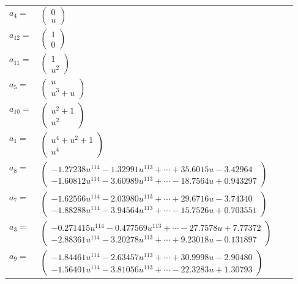 \documentclass[1p]{elsarticle_modified}
\theoremstyle{definition}
\begin{document}
\begin{tabular}{m{7pt} m{180pt} m{7pt} m{180pt} }
\flushright $a_{4}=$&$\begin{pmatrix}0\\u\end{pmatrix}$ \\
\flushright $a_{12}=$&$\begin{pmatrix}1\\0\end{pmatrix}$ \\
\flushright $a_{11}=$&$\begin{pmatrix}1\\u^2\end{pmatrix}$ \\
\flushright $a_{5}=$&$\begin{pmatrix}u\\u^3+u\end{pmatrix}$ \\
\flushright $a_{10}=$&$\begin{pmatrix}u^2+1\\u^2\end{pmatrix}$ \\
\flushright $a_{1}=$&$\begin{pmatrix}u^4+u^2+1\\u^4\end{pmatrix}$ \\
\flushright $a_{8}=$&$\begin{pmatrix}-1.27238 u^{114}-1.32991 u^{113}+\cdots+35.6015 u-3.42964\\-1.60812 u^{114}-3.60989 u^{113}+\cdots-18.7564 u+0.943297\end{pmatrix}$ \\
\flushright $a_{7}=$&$\begin{pmatrix}-1.62566 u^{114}-2.03980 u^{113}+\cdots+29.6716 u-3.74340\\-1.88288 u^{114}-3.94564 u^{113}+\cdots-15.7526 u+0.703551\end{pmatrix}$ \\
\flushright $a_{3}=$&$\begin{pmatrix}-0.271415 u^{114}-0.477569 u^{113}+\cdots-27.7578 u+7.77372\\-2.88361 u^{114}-3.20278 u^{113}+\cdots+9.23018 u-0.131897\end{pmatrix}$ \\
\flushright $a_{9}=$&$\begin{pmatrix}-1.84461 u^{114}-2.63457 u^{113}+\cdots+30.9998 u-2.90480\\-1.56401 u^{114}-3.81056 u^{113}+\cdots-22.3283 u+1.30793\end{pmatrix}$ \\

\end{tabular}
\end{document}

